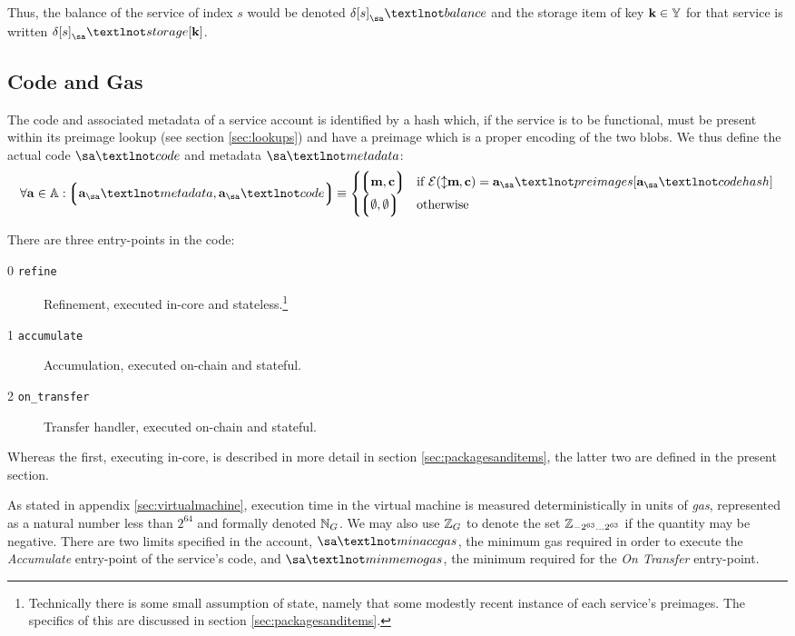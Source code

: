 Thus, the balance of the service of index $s$ would be denoted $\accounts\subb{s}_\sa¬balance$ and the storage item of key $\mathbf{k} \in \mathbb{Y}$ for that service is written $\accounts\subb{s}_\sa¬storage[\mathbf{k}]$.








\subsection{Code and Gas}

The code and associated metadata of a service account is identified by a hash which, if the service is to be functional, must be present within its preimage lookup (see section \ref{sec:lookups}) and have a preimage which is a proper encoding of the two blobs. We thus define the actual code $\sa¬code$ and metadata $\sa¬metadata$:
\begin{align}
  \forall \mathbf{a} \in \serviceaccount : \tup{\mathbf{a}_\sa¬metadata, \mathbf{a}_\sa¬code} \equiv \begin{cases}
    \tup{\mathbf{m}, \mathbf{c}} &\when \se(\var{\mathbf{m}}, \mathbf{c}) = \mathbf{a}_\sa¬preimages[\mathbf{a}_\sa¬codehash] \\
    \tup{\none, \none} &\otherwise
  \end{cases}
\end{align}

There are three entry-points in the code:
\begin{description}
  \item[0 \texttt{refine}]Refinement, executed in-core and stateless.\footnote{Technically there is some small assumption of state, namely that some modestly recent instance of each service's preimages. The specifics of this are discussed in section \ref{sec:packagesanditems}.}
  \item[1 \texttt{accumulate}] Accumulation, executed on-chain and stateful.
  \item[2 \texttt{on\_transfer}] Transfer handler, executed on-chain and stateful.
\end{description}

Whereas the first, executing in-core, is described in more detail in section \ref{sec:packagesanditems}, the latter two are defined in the present section.

As stated in appendix \ref{sec:virtualmachine}, execution time in the \Jam virtual machine is measured deterministically in units of \emph{gas}, represented as a natural number less than $2^{64}$ and formally denoted $\mathbb{N}_G$. We may also use $\mathbb{Z}_G$ to denote the set $\mathbb{Z}_{-2^{63}\dots2^{63}}$ if the quantity may be negative. There are two limits specified in the account, $\sa¬minaccgas$, the minimum gas required in order to execute the \emph{Accumulate} entry-point of the service's code, and $\sa¬minmemogas$, the minimum required for the \emph{On Transfer} entry-point.










